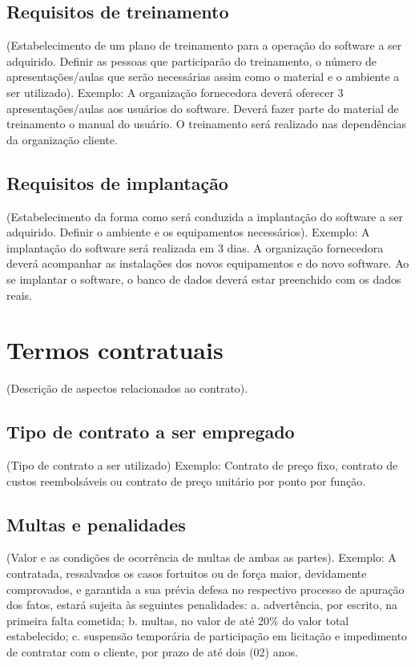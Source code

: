 \subsection{Requisitos de treinamento}
(Estabelecimento de um plano de treinamento para a operação do
software a ser adquirido. Definir as pessoas que participarão do treinamento, o
número de apresentações/aulas que serão necessárias assim como o material e o
ambiente a ser utilizado).
Exemplo: A organização fornecedora deverá oferecer 3 apresentações/aulas
aos usuários do software. Deverá fazer parte do material de treinamento o
manual do usuário. O treinamento será realizado nas dependências da
organização cliente.

\subsection{Requisitos de implantação}
(Estabelecimento da forma como será conduzida a implantação do
software a ser adquirido. Definir o ambiente e os equipamentos necessários).
Exemplo: A implantação do software será realizada em 3 dias. A organização
fornecedora deverá acompanhar as instalações dos novos equipamentos e do
novo software. Ao se implantar o software, o banco de dados deverá estar
preenchido com os dados reais.

\section{Termos contratuais}
(Descrição de aspectos relacionados ao contrato).

\subsection{Tipo de contrato a ser empregado}
(Tipo de contrato a ser utilizado)
Exemplo: Contrato de preço fixo, contrato de custos reembolsáveis ou
contrato de preço unitário por ponto por função.

\subsection{Multas e penalidades}
(Valor e as condições de ocorrência de multas de ambas as partes).
Exemplo: A contratada, ressalvados os casos fortuitos ou de força maior,
devidamente comprovados, e garantida a sua prévia defesa no respectivo
processo de apuração dos fatos, estará sujeita às seguintes penalidades:
a. advertência, por escrito, na primeira falta cometida;
b. multas, no valor de até 20\% do valor total estabelecido;
c. suspensão temporária de participação em licitação e impedimento de
contratar com o cliente, por prazo de até dois (02) anos.


